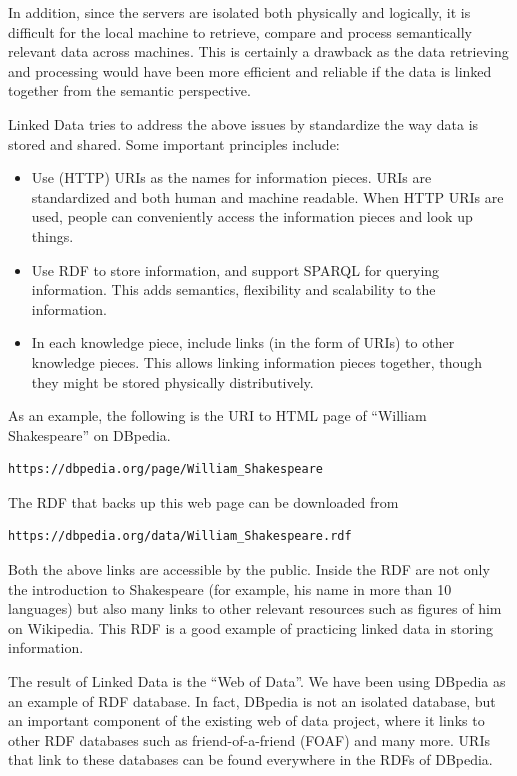 In addition, since the servers are isolated both physically and logically, it is difficult for the local machine to retrieve, compare and process semantically relevant data across machines. This is certainly a drawback as the data retrieving and processing would have been more efficient and reliable if the data is linked together from the semantic perspective.

Linked Data tries to address the above issues by standardize the way data is stored and shared. Some important principles include:
\begin{itemize}
	\item Use (HTTP) URIs as the names for information pieces. URIs are standardized and both human and machine readable. When HTTP URIs are used, people can conveniently access the information pieces and look up things.
	\item Use RDF to store information, and support SPARQL for querying information. This adds semantics, flexibility and scalability to the information.
	\item In each knowledge piece, include links (in the form of URIs) to other knowledge pieces. This allows linking information pieces together, though they might be stored physically distributively.
\end{itemize} 

As an example, the following is the URI to HTML page of ``William Shakespeare'' on DBpedia.
\begin{lstlisting}
https://dbpedia.org/page/William_Shakespeare
\end{lstlisting}
The RDF that backs up this web page can be downloaded from
\begin{lstlisting}
https://dbpedia.org/data/William_Shakespeare.rdf
\end{lstlisting}
Both the above links are accessible by the public. Inside the RDF are not only the introduction to Shakespeare (for example, his name in more than 10 languages) but also many links to other relevant resources such as figures of him on Wikipedia. This RDF is a good example of practicing linked data in storing information.

The result of Linked Data is the ``Web of Data''. We have been using DBpedia as an example of RDF database. In fact, DBpedia is not an isolated database, but an important component of the existing web of data project, where it links to other RDF databases such as friend-of-a-friend (FOAF) and many more. URIs that link to these databases can be found everywhere in the RDFs of DBpedia.


